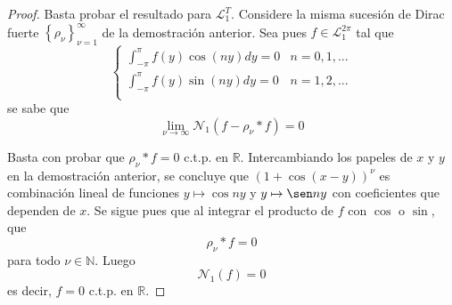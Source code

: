 \documentclass[12pt]{report}
\theoremstyle{largebreak}
\newcommand{\N}[2]{\ensuremath{\mathcal{N}_{#1}\left(#2\right)}}
\begin{document}
    \begin{proof}
        Basta probar el resultado para $\mathcal{L}_1^T$. Considere la misma sucesión de Dirac fuerte $\left\{\rho_\nu \right\}_{\nu=1}^\infty$ de la demostración anterior. Sea pues $f\in\mathcal{L}_1^{2\pi}$ tal que
        \begin{equation*}
            \left\{
                \begin{array}{cr}
                    \int_{-\pi}^{\pi}f(y)\cos(ny)dy=0 & n=0,1,...\\
                    \int_{-\pi}^{\pi}f(y)\sin(ny)dy=0 & n=1,2,...\\
                \end{array}
            \right.
        \end{equation*}
        se sabe que
        \begin{equation*}
            \lim_{\nu\rightarrow\infty}\N{1}{f-\rho_\nu*f}=0
        \end{equation*}
    
        Basta con probar que $\rho_\nu*f=0$ c.t.p. en $\mathbb{R}$. Intercambiando los papeles de $x$ y $y$ en la demostración anterior, se concluye que $(1+\cos(x-y))^\nu$ es combinación lineal de funciones $y\mapsto\cos ny$ y $y\mapsto\sen ny$ con coeficientes que dependen de $x$. Se sigue pues que al integrar el producto de $f$ con $\cos$ o $\sin$, que
        \begin{equation*}
            \rho_\nu*f=0
        \end{equation*}
        para todo $\nu\in\mathbb{N}$. Luego
        \begin{equation*}
            \N{1}{f}=0
        \end{equation*}
        es decir, $f=0$ c.t.p. en $\mathbb{R}$.
    \end{proof}
\end{document}
